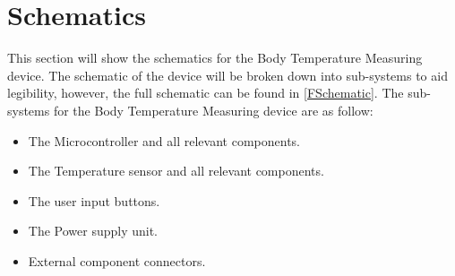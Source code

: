 \section{Schematics}
This section will show the schematics for the Body Temperature Measuring device. The schematic of the device will be broken down into sub-systems to aid legibility, however, the full schematic can be found in \autoref{FSchematic}. The sub-systems for the Body Temperature Measuring device are as follow:
\begin{itemize}[noitemsep]
	\item The Microcontroller and all relevant components.
	\item The Temperature sensor and all relevant components.
	\item The user input buttons.
	\item The Power supply unit.
	\item External component connectors.
\end{itemize}

